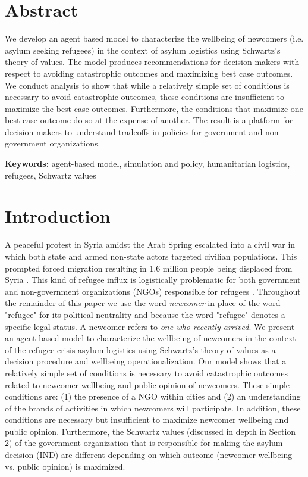 \documentclass{scspaperproc}
\theoremstyle{scsthe}
\begin{document}
\maketitle

\section*{Abstract}

We develop an agent based model to characterize the wellbeing of newcomers (i.e. asylum seeking refugees) in the context of asylum logistics using Schwartz's theory of values. The model produces recommendations for decision-makers with respect to avoiding catastrophic outcomes and maximizing best case outcomes. We conduct analysis to show that while a relatively simple set of conditions is necessary to avoid catastrophic outcomes, these conditions are insufficient to maximize the best case outcomes. Furthermore, the conditions that maximize one best case outcome do so at the expense of another. The result is a platform for decision-makers to understand tradeoffs in policies for government and non-government organizations.

\textbf{Keywords:} agent-based model, simulation and policy, humanitarian logistics, refugees, Schwartz values

\section{Introduction}
\label{sec:intro}
A peaceful protest in Syria amidst the Arab Spring escalated into a civil war in which both state and armed non-state actors targeted civilian populations. This prompted forced migration resulting in 1.6 million people being displaced from Syria \cite{42,90}. This kind of refugee influx is logistically problematic for both government and non-government organizations (NGOs) responsible for refugees \cite{66}. Throughout the remainder of this paper we use the word \emph{newcomer} in place of the word "refugee" for its political neutrality and because the word "refugee" denotes a specific legal status. A newcomer refers to \emph{one who recently arrived}. We present an agent-based model to characterize the wellbeing of newcomers in the context of the refugee crisis asylum logistics using Schwartz's theory of values as a decision procedure and wellbeing operationalization. Our model shows that a relatively simple set of conditions is necessary to avoid catastrophic outcomes related to newcomer wellbeing and public opinion of newcomers. These simple conditions are: (1) the presence of a NGO within cities and (2) an understanding of the brands of activities in which newcomers will participate. In addition, these conditions are necessary but insufficient to maximize newcomer wellbeing and public opinion. Furthermore, the Schwartz values (discussed in depth in Section 2) of the government organization that is responsible for making the asylum decision (IND) are different depending on which outcome (newcomer wellbeing vs. public opinion) is maximized.
\end{document}
